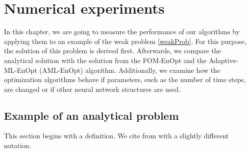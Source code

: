 \chapter{\label{chapterNumericalExperiments}Numerical experiments}

In this chapter, we are going to measure the performance of our algorithms by applying them to an example of the weak problem \eqref{weakProb}. For this purpose, the solution of this problem is derived first. Afterwards, we compare the analytical solution with the solution from the FOM-EnOpt and the Adaptive-ML-EnOpt (AML-EnOpt) algorithm. Additionally, we examine how the optimization algorithms behave if parameters, such as the number of time steps, are changed or if other neural network structures are used.

\section{Example of an analytical problem}

This section begins with a definition. We cite from \cite{articleMeidner} with a slightly different notation.

